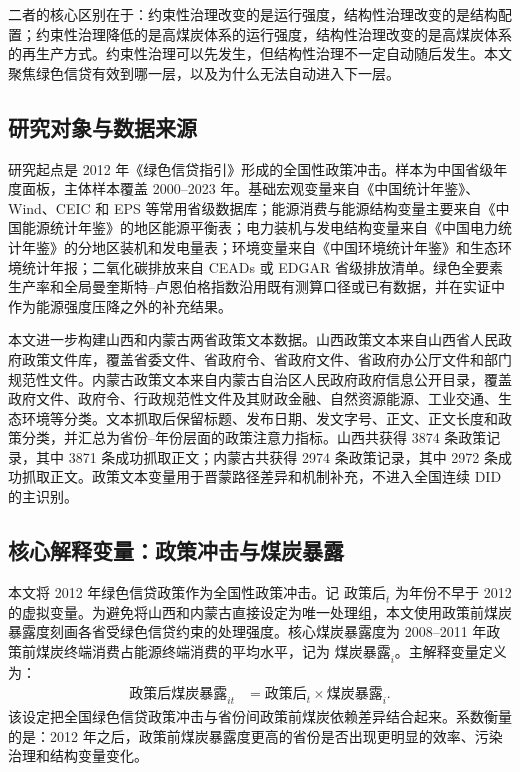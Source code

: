 \documentclass[UTF8,12pt]{ctexart}
\begin{document}
二者的核心区别在于：约束性治理改变的是运行强度，结构性治理改变的是结构配置；约束性治理降低的是高煤炭体系的运行强度，结构性治理改变的是高煤炭体系的再生产方式。约束性治理可以先发生，但结构性治理不一定自动随后发生。本文聚焦绿色信贷有效到哪一层，以及为什么无法自动进入下一层。

\subsection{研究对象与数据来源}

研究起点是 2012 年《绿色信贷指引》形成的全国性政策冲击。样本为中国省级年度面板，主体样本覆盖 2000--2023 年。基础宏观变量来自《中国统计年鉴》、Wind、CEIC 和 EPS 等常用省级数据库；能源消费与能源结构变量主要来自《中国能源统计年鉴》的地区能源平衡表；电力装机与发电结构变量来自《中国电力统计年鉴》的分地区装机和发电量表；环境变量来自《中国环境统计年鉴》和生态环境统计年报；二氧化碳排放来自 CEADs 或 EDGAR 省级排放清单。绿色全要素生产率和全局曼奎斯特--卢恩伯格指数沿用既有测算口径或已有数据，并在实证中作为能源强度压降之外的补充结果。

本文进一步构建山西和内蒙古两省政策文本数据。山西政策文本来自山西省人民政府政策文件库，覆盖省委文件、省政府令、省政府文件、省政府办公厅文件和部门规范性文件。内蒙古政策文本来自内蒙古自治区人民政府政府信息公开目录，覆盖政府文件、政府令、行政规范性文件及其财政金融、自然资源能源、工业交通、生态环境等分类。文本抓取后保留标题、发布日期、发文字号、正文、正文长度和政策分类，并汇总为省份--年份层面的政策注意力指标。山西共获得 3874 条政策记录，其中 3871 条成功抓取正文；内蒙古共获得 2974 条政策记录，其中 2972 条成功抓取正文。政策文本变量用于晋蒙路径差异和机制补充，不进入全国连续 DID 的主识别。

\subsection{核心解释变量：政策冲击与煤炭暴露}

本文将 2012 年绿色信贷政策作为全国性政策冲击。记 $\text{政策后}_{t}$ 为年份不早于 2012 的虚拟变量。为避免将山西和内蒙古直接设定为唯一处理组，本文使用政策前煤炭暴露度刻画各省受绿色信贷约束的处理强度。核心煤炭暴露度为 2008--2011 年政策前煤炭终端消费占能源终端消费的平均水平，记为 $\text{煤炭暴露}_{i}$。主解释变量定义为：
\[
    \begin{aligned}
    \text{政策后煤炭暴露}_{it}
    &= \text{政策后}_{t} \times \text{煤炭暴露}_{i}.
    \end{aligned}
\]
该设定把全国绿色信贷政策冲击与省份间政策前煤炭依赖差异结合起来。系数衡量的是：2012 年之后，政策前煤炭暴露度更高的省份是否出现更明显的效率、污染治理和结构变量变化。
\end{document}
